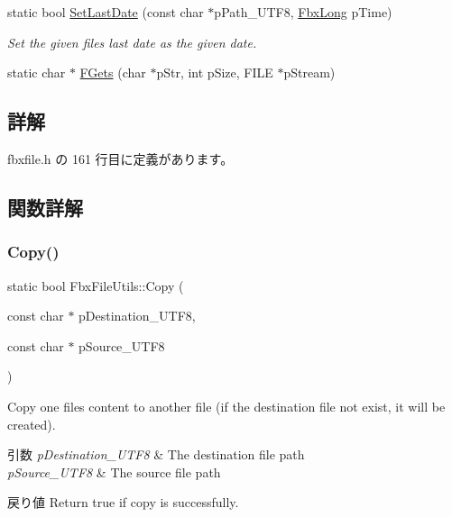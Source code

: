 \begin{DoxyCompactItemize}
static bool \hyperlink{class_fbx_file_utils_a5bdf966c2556bd9c4a86121452788053}{Set\+Last\+Date} (const char $\ast$p\+Path\+\_\+\+U\+T\+F8, \hyperlink{fbxtypes_8h_a70c7780f9a9ff5b9b08ab757b34e0726}{Fbx\+Long} p\+Time)
\begin{DoxyCompactList}\small\item\em Set the given file\textquotesingle{}s last date as the given date. \end{DoxyCompactList}\item 
static char $\ast$ \hyperlink{class_fbx_file_utils_aa828e725caf5d34b9ae12abc1c0b8993}{F\+Gets} (char $\ast$p\+Str, int p\+Size, F\+I\+LE $\ast$p\+Stream)
\end{DoxyCompactItemize}


\subsection{詳解}


 fbxfile.\+h の 161 行目に定義があります。



\subsection{関数詳解}
\mbox{\label{class_fbx_file_utils_aeb9e95e483ce2430c54669c507fa2e21}} 
\subsubsection{\texorpdfstring{Copy()}{Copy()}}
{\footnotesize\ttfamily static bool Fbx\+File\+Utils\+::\+Copy (\begin{DoxyParamCaption}\item[{const char $\ast$}]{p\+Destination\+\_\+\+U\+T\+F8,  }\item[{const char $\ast$}]{p\+Source\+\_\+\+U\+T\+F8 }\end{DoxyParamCaption})\hspace{0.3cm}{\ttfamily [static]}}

Copy one file\textquotesingle{}s content to another file (if the destination file not exist, it will be created). 
\begin{DoxyParams}{引数}
{\em p\+Destination\+\_\+\+U\+T\+F8} & The destination file path \\
\hline
{\em p\+Source\+\_\+\+U\+T\+F8} & The source file path \\
\hline
\end{DoxyParams}
\begin{DoxyReturn}{戻り値}
Return true if copy is successfully. 
\end{DoxyReturn}
\mbox{\label{class_fbx_file_utils_adfd2d189a647cb9c90b8773868e6f36e}} 
